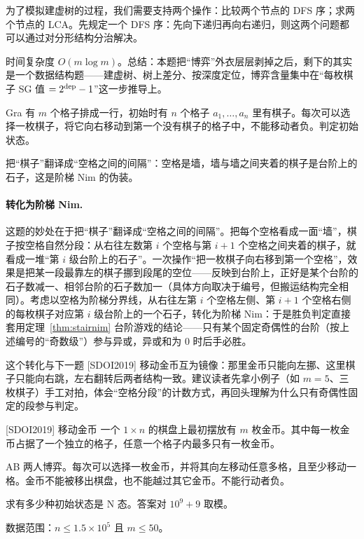 为了模拟建虚树的过程，我们需要支持两个操作：比较两个节点的 DFS 序；求两个节点的 LCA。先规定一个 DFS 序：先向下递归再向右递归，则这两个问题都可以通过对分形结构分治解决。

\cost 时间复杂度 $O(m\log m)$。总结：本题把“博弈”外衣层层剥掉之后，剩下的其实是一个数据结构题——建虚树、树上差分、按深度定位，博弈含量集中在“每枚棋子 SG 值 $=2^{\operatorname{dep}}-1$”这一步推导上。


\begin{problem}{Gra}
有 $m$ 个格子排成一行，初始时有 $n$ 个格子 $a_1,\ldots,a_n$ 里有棋子。每次可以选择一枚棋子，将它向右移动到第一个没有棋子的格子中，不能移动者负。判定初始状态。
\end{problem}

\hint 把“棋子”翻译成“空格之间的间隔”：空格是墙，墙与墙之间夹着的棋子是台阶上的石子，这是阶梯 Nim 的伪装。

\sol \paragraph{转化为阶梯 Nim.} 这题的妙处在于把“棋子”翻译成“空格之间的间隔”。把每个空格看成一面“墙”，棋子按空格自然分段：从右往左数第 $i$ 个空格与第 $i+1$ 个空格之间夹着的棋子，就看成一堆“第 $i$ 级台阶上的石子”。一次操作“把一枚棋子向右移到第一个空格”，效果是把某一段最靠左的棋子挪到段尾的空位——反映到台阶上，正好是某个台阶的石子数减一、相邻台阶的石子数加一（具体方向取决于编号，但搬运结构完全相同）。考虑以空格为阶梯分界线，从右往左第 $i$ 个空格左侧、第 $i+1$ 个空格右侧的每枚棋子对应第 $i$ 级台阶上的一个石子，转化为阶梯 Nim：于是胜负判定直接套用定理~\ref{thm:stairnim} 台阶游戏的结论——只有某个固定奇偶性的台阶（按上述编号的“奇数级”）参与异或，异或和为 $0$ 时后手必胜。

这个转化与下一题 [SDOI2019] 移动金币互为镜像：那里金币只能向左挪、这里棋子只能向右跳，左右翻转后两者结构一致。建议读者先拿小例子（如 $m=5$、三枚棋子）手工对拍，体会“空格分段”的计数方式，再回头理解为什么只有奇偶性固定的段参与判定。

\begin{problem}{[SDOI2019] 移动金币}
一个 $1\times n$ 的棋盘上最初摆放有 $m$ 枚金币。其中每一枚金币占据了一个独立的格子，任意一个格子内最多只有一枚金币。

AB 两人博弈。每次可以选择一枚金币，并将其向左移动任意多格，且至少移动一格。金币不能被移出棋盘，也不能越过其它金币。不能行动者负。

求有多少种初始状态是 N 态。答案对 $10^{9}+9$ 取模。

数据范围：$n\le1.5\times10^{5}$ 且 $m\le50$。
\end{problem}

